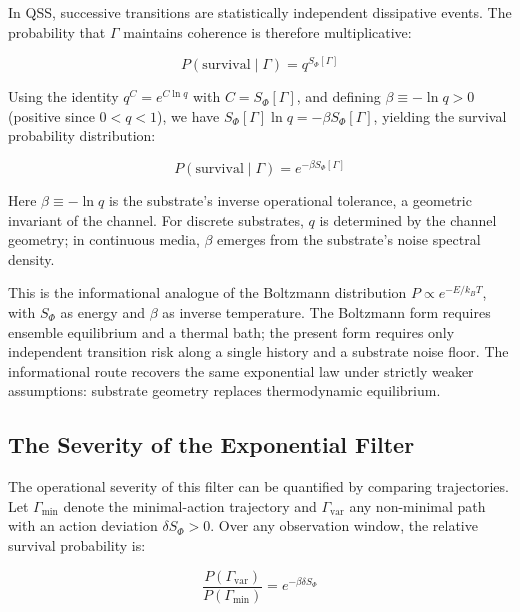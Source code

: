 In QSS, successive transitions are statistically independent dissipative events. The probability that $\Gamma$ maintains coherence is therefore multiplicative:

\begin{equation}
\label{eq:survival_prob1}
    P(\text{survival} \mid \Gamma) 
    = q^{S_\Phi[\Gamma]} 
\end{equation}

Using the identity $q^C = e^{C\ln q}$ with $C = S_\Phi[\Gamma]$, and defining $\beta \equiv -\ln q > 0$ (positive since $0 < q < 1$), we have $S_\Phi[\Gamma]\ln q = -\beta S_\Phi[\Gamma]$, yielding the survival probability distribution:

\begin{equation}
\label{eq:survival_prob}
    P(\text{survival} \mid \Gamma) = e^{-\beta S_\Phi[\Gamma]}
\end{equation}

Here $\beta \equiv -\ln q$ is the substrate's inverse operational tolerance, a geometric invariant of the channel. For discrete substrates, $q$ is determined by the channel geometry; in continuous media, $\beta$ emerges from the substrate's noise spectral density.

This is the informational analogue of the Boltzmann distribution $P \propto e^{-E/k_BT}$, with $S_\Phi$ as energy and $\beta$ as inverse temperature. The Boltzmann form requires ensemble equilibrium and a thermal bath; the present form requires only independent transition risk along a single history and a substrate noise floor. The informational route recovers the same exponential law under strictly weaker assumptions: substrate geometry replaces thermodynamic equilibrium.


\subsection{The Severity of the Exponential Filter}
\label{subsec:severity}

The operational severity of this filter can be quantified by comparing trajectories. Let $\Gamma_{\text{min}}$ denote the minimal-action trajectory and $\Gamma_{\text{var}}$ any non-minimal path with an action deviation $\delta S_\Phi > 0$. Over any observation window, the relative survival probability is:

\begin{equation}
\label{eq:severity}
    \frac{P(\Gamma_{\text{var}})}{P(\Gamma_{\text{min}})} = e^{-\beta \delta S_\Phi}
\end{equation}

